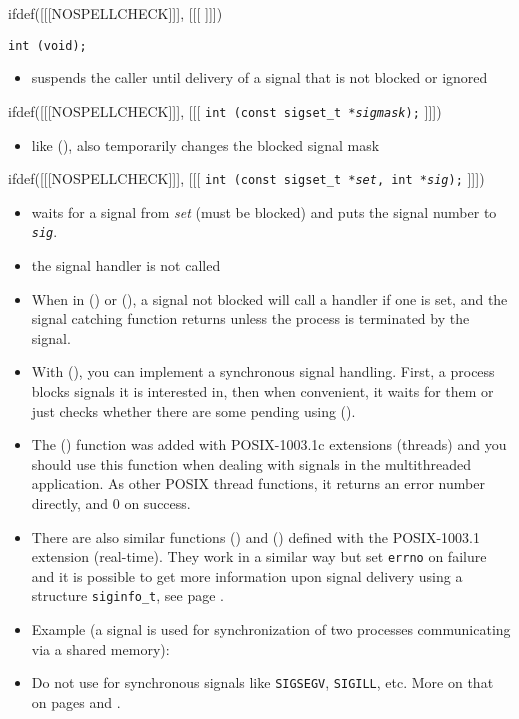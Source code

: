 
\label{SIGWAIT}
ifdef([[[NOSPELLCHECK]]], [[[
]]])

\begin{slide}
\texttt{int (void);}
\begin{itemize}
\item suspends the caller until delivery of a signal that is not blocked or
ignored
\end{itemize}
ifdef([[[NOSPELLCHECK]]], [[[
\texttt{int (const sigset\_t *\emph{sigmask});}
]]])
\begin{itemize}
\item like (), also temporarily changes the blocked signal mask
\end{itemize}
ifdef([[[NOSPELLCHECK]]], [[[
\texttt{int (const sigset\_t *\emph{set}, int *\emph{sig});}
]]])
\begin{itemize}
\item waits for a signal from \emph{set} (must be blocked) and puts the signal
number to \emph{\texttt{sig}}.
\item the signal handler is not called
\end{itemize}
\end{slide}

\begin{itemize}
\item When in () or (), a signal not blocked will
call a handler if one is set, and the signal catching function returns unless
the process is terminated by the signal.
\item With (), you can implement a synchronous signal
handling.  First, a process blocks signals it is interested in, then when
convenient, it waits for them or just checks whether there are some pending
using ().
\item The () function was added with POSIX-1003.1c
extensions (threads) and you should use this function when dealing with signals
in the multithreaded application.  As other POSIX thread functions, it returns
an error number directly, and 0 on success.
\item \label{SIGWAITINFO} There are also similar functions ()
and () defined with the POSIX-1003.1 extension
(real-time).  They work in a similar way but set \texttt{errno} on failure and
it is possible to get more information upon signal delivery using a structure
\texttt{siginfo\_t}, see page \pageref{REALTIMEEXTENSIONS}.
\item Example (a signal is used for synchronization of two processes
communicating via a shared memory): 
\item Do not use for synchronous signals like \texttt{SIGSEGV}, \texttt{SIGILL},
etc.  More on that on pages \pageref{SPECIALSIGNALS} and
\pageref{THREADS_SIGWAIT}. 
\end{itemize}

\endinput

